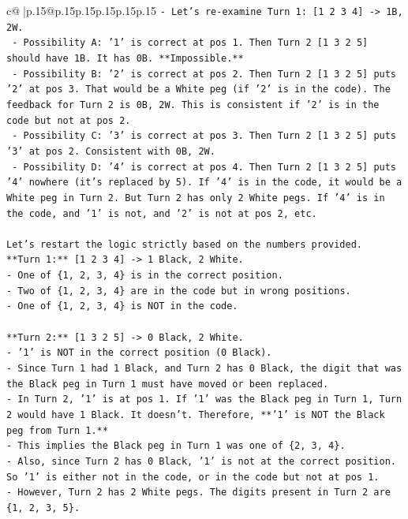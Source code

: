 \documentclass{article}
\begin{document}
{\begin{supertabular}{c@{$\;$}|p{.15\linewidth}@{}p{.15\linewidth}p{.15\linewidth}p{.15\linewidth}p{.15\linewidth}p{.15\linewidth}}
{{{\texttt{{-} Let's re{-}examine Turn 1: {[}1 2 3 4{]} {-}> 1B, 2W.} \\
\texttt{  {-} Possibility A: '1' is correct at pos 1. Then Turn 2 {[}1 3 2 5{]} should have 1B. It has 0B. **Impossible.**} \\
\texttt{  {-} Possibility B: '2' is correct at pos 2. Then Turn 2 {[}1 3 2 5{]} puts '2' at pos 3. That would be a White peg (if '2' is in the code). The feedback for Turn 2 is 0B, 2W. This is consistent if '2' is in the code but not at pos 2.} \\
\texttt{  {-} Possibility C: '3' is correct at pos 3. Then Turn 2 {[}1 3 2 5{]} puts '3' at pos 2. Consistent with 0B, 2W.} \\
\texttt{  {-} Possibility D: '4' is correct at pos 4. Then Turn 2 {[}1 3 2 5{]} puts '4' nowhere (it's replaced by 5). If '4' is in the code, it would be a White peg in Turn 2. But Turn 2 has only 2 White pegs. If '4' is in the code, and '1' is not, and '2' is not at pos 2, etc.} \\
\\ 
\texttt{Let's restart the logic strictly based on the numbers provided.} \\
\texttt{**Turn 1:** {[}1 2 3 4{]} {-}> 1 Black, 2 White.} \\
\texttt{{-} One of \{1, 2, 3, 4\} is in the correct position.} \\
\texttt{{-} Two of \{1, 2, 3, 4\} are in the code but in wrong positions.} \\
\texttt{{-} One of \{1, 2, 3, 4\} is NOT in the code.} \\
\\ 
\texttt{**Turn 2:** {[}1 3 2 5{]} {-}> 0 Black, 2 White.} \\
\texttt{{-} '1' is NOT in the correct position (0 Black).} \\
\texttt{{-} Since Turn 1 had 1 Black, and Turn 2 has 0 Black, the digit that was the Black peg in Turn 1 must have moved or been replaced.} \\
\texttt{{-} In Turn 2, '1' is at pos 1. If '1' was the Black peg in Turn 1, Turn 2 would have 1 Black. It doesn't. Therefore, **'1' is NOT the Black peg from Turn 1.**} \\
\texttt{{-} This implies the Black peg in Turn 1 was one of \{2, 3, 4\}.} \\
\texttt{{-} Also, since Turn 2 has 0 Black, '1' is not at the correct position. So '1' is either not in the code, or in the code but not at pos 1.} \\
\texttt{{-} However, Turn 2 has 2 White pegs. The digits present in Turn 2 are \{1, 2, 3, 5\}.} \\
}}}
\end{supertabular}}
\end{document}
